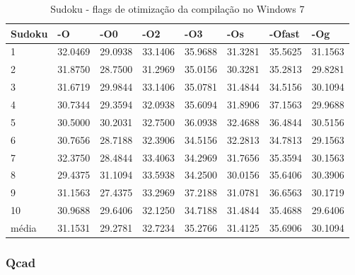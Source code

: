 \begin{table}[!ht]
\centering
\tiny
\caption{Sudoku - flags de otimização da compilação no Windows 7}
\label{tab:otimizacao_compilacao:windows:sudoku}
\begin{tabular}{llllllll}
\textbf{Sudoku}    & \textbf{-O}  & \textbf{-O0}   & \textbf{-O2} & \textbf{-O3} & \textbf{-Os} & \textbf{-Ofast} & \textbf{-Og} \\ \toprule
1                  & 32.0469      & 29.0938        & 33.1406      & 35.9688      & 31.3281      & 35.5625         & 31.1563     \\ 
2                  & 31.8750      & 28.7500        & 31.2969      & 35.0156      & 30.3281      & 35.2813         & 29.8281     \\ 
3                  & 31.6719      & 29.9844        & 33.1406      & 35.0781      & 31.4844      & 34.5156         & 30.1094     \\ 
4                  & 30.7344      & 29.3594        & 32.0938      & 35.6094      & 31.8906      & 37.1563         & 29.9688     \\ 
5                  & 30.5000      & 30.2031        & 32.7500      & 36.0938      & 32.4688      & 36.4844         & 30.5156     \\ 
6                  & 30.7656      & 28.7188        & 32.3906      & 34.5156      & 32.2813      & 34.7813         & 29.1563     \\ 
7                  & 32.3750      & 28.4844        & 33.4063      & 34.2969      & 31.7656      & 35.3594         & 30.1563     \\ 
8                  & 29.4375      & 31.1094        & 33.5938      & 34.2500      & 30.0156      & 35.6406         & 30.3906     \\ 
9                  & 31.1563      & 27.4375        & 33.2969      & 37.2188      & 31.0781      & 36.6563         & 30.1719     \\ 
10                 & 30.9688      & 29.6406        & 32.1250      & 34.7188      & 31.4844      & 35.4688         & 29.6406     \\ \bottomrule
média              & 31.1531      & 29.2781        & 32.7234      & 35.2766      & 31.4125      & 35.6906         & 30.1094     \\ 
\end{tabular}
\end{table}

\clearpage
\subsubsection*{Qcad}

